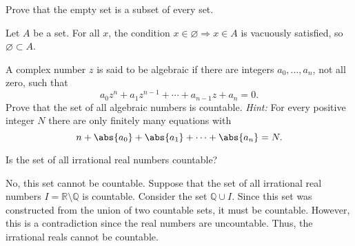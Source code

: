 \documentclass{zupan}
\begin{document}
\begin{exercise}{1}
  Prove that the empty set is a subset of every set.
\end{exercise}

\begin{solution}
  Let $A$ be a set. For all $x$, the condition $x \in \varnothing \Rightarrow x
  \in A$ is vacuously satisfied, so $\varnothing \subset A$.
\end{solution}

\begin{exercise}{2}
  A complex number $z$ is said to be algebraic if there are integers $a_0 ,
  \dots, a_n$, not all zero, such that \[a_0z^n + a_1z^{n - 1} + \cdots + a_{n
  - 1}z + a_n = 0.\] Prove that the set of all algebraic numbers is countable.
  \textit{Hint:} For every positive integer $N$ there are only finitely many
  equations with \[n + \abs{a_0} + \abs{a_1} + \cdots + \abs{a_n} = N.\]
\end{exercise}

\begin{exercise}{4}
  Is the set of all irrational real numbers countable?
\end{exercise}

\begin{solution}
  No, this set cannot be countable. Suppose that the set of all irrational real
  numbers $I = \mathbb{R} \setminus \mathbb{Q}$ is countable. Consider the set
  $\mathbb{Q} \cup I$. Since this set was constructed from the union of two
  countable sets, it must be countable. However, this is a contradiction since
  the real numbers are uncountable. Thus, the irrational reals cannot be
  countable.
\end{solution}
\end{document}
